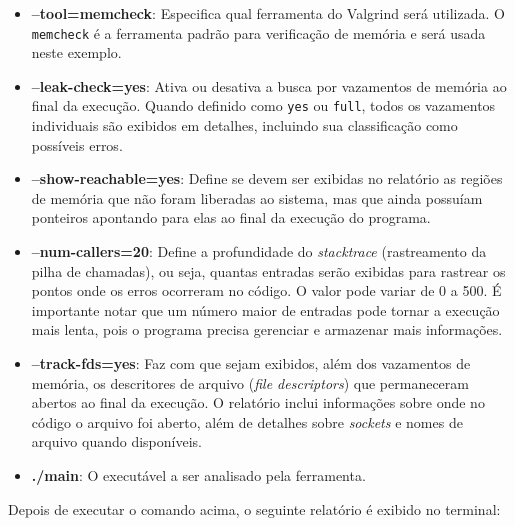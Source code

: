 \begin{itemize}
    \item \textbf{--tool=memcheck}: Especifica qual ferramenta do Valgrind será utilizada. O \texttt{memcheck} é a 
        ferramenta padrão para verificação de memória e será usada neste exemplo.
    \item \textbf{--leak-check=yes}: Ativa ou desativa a busca por vazamentos de memória ao final da execução. Quando 
        definido como \texttt{yes} ou \texttt{full}, todos os vazamentos individuais são exibidos em detalhes, incluindo 
        sua classificação como possíveis erros.
    \item \textbf{--show-reachable=yes}: Define se devem ser exibidas no relatório as regiões de memória que não foram 
        liberadas ao sistema, mas que ainda possuíam ponteiros apontando para elas ao final da execução do programa.
    \item \textbf{--num-callers=20}: Define a profundidade do \textit{stacktrace} (rastreamento da pilha de chamadas), 
        ou seja, quantas entradas serão exibidas para rastrear os pontos onde os erros ocorreram no código. O valor pode 
        variar de 0 a 500. É importante notar que um número maior de entradas pode tornar a execução mais lenta, pois o 
        programa precisa gerenciar e armazenar mais informações.
    \item \textbf{--track-fds=yes}: Faz com que sejam exibidos, além dos vazamentos de memória, os descritores de arquivo 
        (\textit{file descriptors}) que permaneceram abertos ao final da execução. O relatório inclui informações sobre 
        onde no código o arquivo foi aberto, além de detalhes sobre \textit{sockets} e nomes de arquivo quando disponíveis.
    \item \textbf{./main}: O executável a ser analisado pela ferramenta.
\end{itemize}

Depois de executar o comando acima, o seguinte relatório é exibido no terminal:

